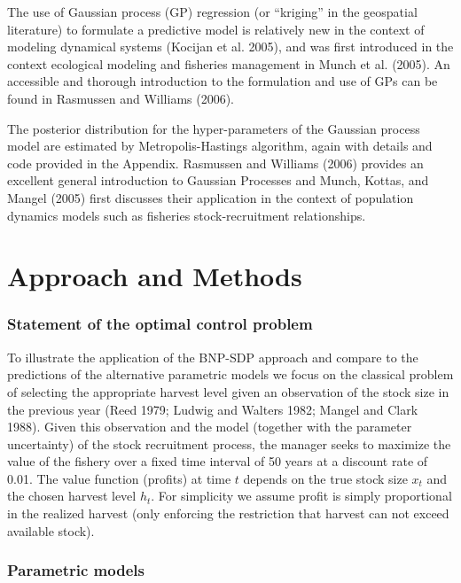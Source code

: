 \documentclass[author-year, review]{elsarticle} %
\begin{document}
The use of Gaussian process (GP) regression (or ``kriging'' in the
geospatial literature) to formulate a predictive model is relatively new
in the context of modeling dynamical systems (Kocijan et al. 2005), and
was first introduced in the context ecological modeling and fisheries
management in Munch et al. (2005). An accessible and thorough
introduction to the formulation and use of GPs can be found in Rasmussen
and Williams (2006).

The posterior distribution for the hyper-parameters of the Gaussian
process model are estimated by Metropolis-Hastings algorithm, again with
details and code provided in the Appendix. Rasmussen and Williams (2006)
provides an excellent general introduction to Gaussian Processes and
Munch, Kottas, and Mangel (2005) first discusses their application in
the context of population dynamics models such as fisheries
stock-recruitment relationships.

\section{Approach and Methods}\label{approach-and-methods}

\subsubsection{Statement of the optimal control
problem}\label{statement-of-the-optimal-control-problem}

To illustrate the application of the BNP-SDP approach and compare to the
predictions of the alternative parametric models we focus on the
classical problem of selecting the appropriate harvest level given an
observation of the stock size in the previous year (Reed 1979; Ludwig
and Walters 1982; Mangel and Clark 1988). Given this observation and the
model (together with the parameter uncertainty) of the stock recruitment
process, the manager seeks to maximize the value of the fishery over a
fixed time interval of 50 years at a discount rate of 0.01. The value
function (profits) at time $t$ depends on the true stock size $x_t$ and
the chosen harvest level $h_t$. For simplicity we assume profit is
simply proportional in the realized harvest (only enforcing the
restriction that harvest can not exceed available stock).

\subsubsection{Parametric models}\label{parametric-models}
\end{document}
